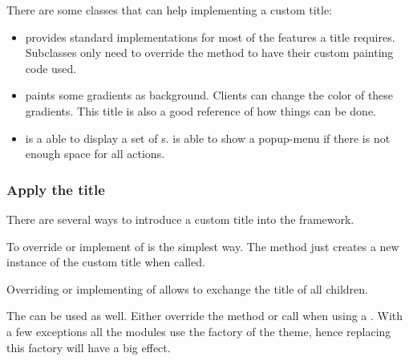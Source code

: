 There are some classes that can help implementing a custom title:
\begin{itemize}
	\item {} provides standard implementations for most of the features a title requires. Subclasses only need to override the method \linebreak {} to have their custom painting code used.
	\item {} paints some gradients as background. Clients can change the color of these gradients. This title is also a good reference of how things can be done.
	\item {} is a  able to display a set of s. \linebreak {} is able to show a popup-menu if there is not enough space for all actions.
\end{itemize}



\subsubsection{Apply the title}
There are several ways to introduce a custom title into the framework.

To override or implement  of  is the simplest way. The method just creates a new instance of the custom title when called.

Overriding or implementing  of  allows to exchange the title of all children.

The  can be used as well. Either override the method \linebreak {} or call  when using a . With a few exceptions all the modules use the factory of the theme, hence replacing this factory will have a big effect.

